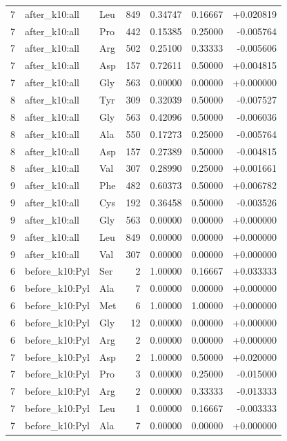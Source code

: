 \begin{longtable}{r l l r r r r}
7 & after\_k10:all & Leu & 849 & 0.34747 & 0.16667 & +0.020819 \\
7 & after\_k10:all & Pro & 442 & 0.15385 & 0.25000 & -0.005764 \\
7 & after\_k10:all & Arg & 502 & 0.25100 & 0.33333 & -0.005606 \\
7 & after\_k10:all & Asp & 157 & 0.72611 & 0.50000 & +0.004815 \\
7 & after\_k10:all & Gly & 563 & 0.00000 & 0.00000 & +0.000000 \\
8 & after\_k10:all & Tyr & 309 & 0.32039 & 0.50000 & -0.007527 \\
8 & after\_k10:all & Gly & 563 & 0.42096 & 0.50000 & -0.006036 \\
8 & after\_k10:all & Ala & 550 & 0.17273 & 0.25000 & -0.005764 \\
8 & after\_k10:all & Asp & 157 & 0.27389 & 0.50000 & -0.004815 \\
8 & after\_k10:all & Val & 307 & 0.28990 & 0.25000 & +0.001661 \\
9 & after\_k10:all & Phe & 482 & 0.60373 & 0.50000 & +0.006782 \\
9 & after\_k10:all & Cys & 192 & 0.36458 & 0.50000 & -0.003526 \\
9 & after\_k10:all & Gly & 563 & 0.00000 & 0.00000 & +0.000000 \\
9 & after\_k10:all & Leu & 849 & 0.00000 & 0.00000 & +0.000000 \\
9 & after\_k10:all & Val & 307 & 0.00000 & 0.00000 & +0.000000 \\
6 & before\_k10:Pyl & Ser & 2 & 1.00000 & 0.16667 & +0.033333 \\
6 & before\_k10:Pyl & Ala & 7 & 0.00000 & 0.00000 & +0.000000 \\
6 & before\_k10:Pyl & Met & 6 & 1.00000 & 1.00000 & +0.000000 \\
6 & before\_k10:Pyl & Gly & 12 & 0.00000 & 0.00000 & +0.000000 \\
6 & before\_k10:Pyl & Arg & 2 & 0.00000 & 0.00000 & +0.000000 \\
7 & before\_k10:Pyl & Asp & 2 & 1.00000 & 0.50000 & +0.020000 \\
7 & before\_k10:Pyl & Pro & 3 & 0.00000 & 0.25000 & -0.015000 \\
7 & before\_k10:Pyl & Arg & 2 & 0.00000 & 0.33333 & -0.013333 \\
7 & before\_k10:Pyl & Leu & 1 & 0.00000 & 0.16667 & -0.003333 \\
7 & before\_k10:Pyl & Ala & 7 & 0.00000 & 0.00000 & +0.000000 \\

\end{longtable}
